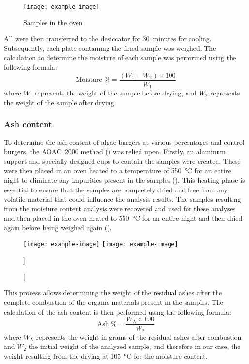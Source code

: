 \begin{figure}[H]
	\centering
	\texttt{[image: example-image]}
	\caption[]{Samples in the oven}
	\label{fig:}
\end{figure}

All were then transferred to the desiccator for \qty{30}{minutes} for cooling. Subsequently, each plate containing the dried sample was weighed. The calculation to determine the moisture of each sample was performed using the following formula:\zariv{}
\[
	\text{Moisture \%} = \frac{(W_1 - W_2) \times 100}{W_1}
\]
where $ W_1 $ represents the weight of the sample before drying, and $ W_2 $ represents the weight of the sample after drying.


\subsubsection{Ash content}
To determine the ash content of algae burgers at various percentages and control burgers, the AOAC~2000 method () was relied upon. Firstly, an aluminum support and specially designed cups to contain the samples were created. These were then placed in an oven heated to a temperature of \qty{550}{\degreeCelsius} for an entire night to eliminate any impurities present in the samples (). This heating phase is essential to ensure that the samples are completely dried and free from any volatile material that could influence the analysis results. The samples resulting from the moisture content analysis were recovered and used for these analyses and then placed in the oven heated to \qty{550}{\degreeCelsius} for an entire night and then dried again before being weighed again ().

\begin{figure}[H]
\centering
		{\texttt{[image: example-image]}}%
\hfill
		{\texttt{[image: example-image]}}%
\caption%
[]%
{}
\label{fig:}
\end{figure}

This process allows determining the weight of the residual ashes after the complete combustion of the organic materials present in the samples. The calculation of the ash content is then performed using the following formula:
\[
\text{Ash \%} = \frac{W_\text{A} \times 100}{W_2}
\]
where $ W_\text{A} $ represents the weight in grams of the residual ashes after combustion and $ W_2 $ the initial weight of the analyzed sample, and therefore in our case, the weight resulting from the drying at \qty{105}{\degreeCelsius} for the moisture content.


